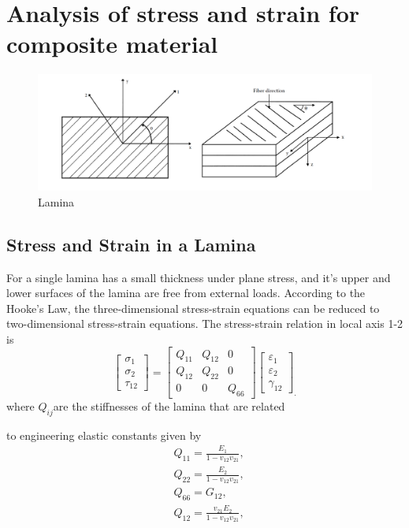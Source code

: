 \section{Analysis of stress and strain for composite material}

\begin{figure}[!htb]
	\centering
	\includegraphics[width=\linewidth]{image/lamina_local_global_axes.png}
\caption{Lamina}
  	\label{fig:lamina}
\end{figure}

\subsection{Stress and Strain in a Lamina}
For a single lamina has a small thickness under plane stress, and it's upper and lower surfaces of the lamina are
free from external loads. According to the Hooke's Law, the three-dimensional stress-strain equations can be reduced to
two-dimensional stress-strain equations. The stress-strain relation in local axis 1-2 is
\begin{equation}
    \begin{bmatrix}
        \sigma _1\\
        \sigma _2\\
        \tau_{12}
    \end{bmatrix}
    =
    \begin{bmatrix}
        Q_{11} & Q_{12} & 0\\
        Q_{12} & Q_{22} & 0\\
        0      &  0     & Q_{66}
    \end{bmatrix}
    \begin{bmatrix}
        \varepsilon_1\\
        \varepsilon_2\\\gamma_{12}
	\end{bmatrix}_{\textstyle .} 
\end{equation}
where $Q_{ij} $are the stiffnesses of the lamina that are related

to engineering elastic constants given by
\begin{equation}
    \begin{split}
	&Q_{11}=\frac{E_1}{1-v_{12}v_{21}},\\
	&Q_{22}=\frac{E_2}{1-v_{12}v_{21}},\\
	&Q_{66}=G_{12},\\
	&Q_{12}=\frac{v_{21}E_2}{1-v_{12}v_{21}},\\
    \end{split}
\end{equation}

